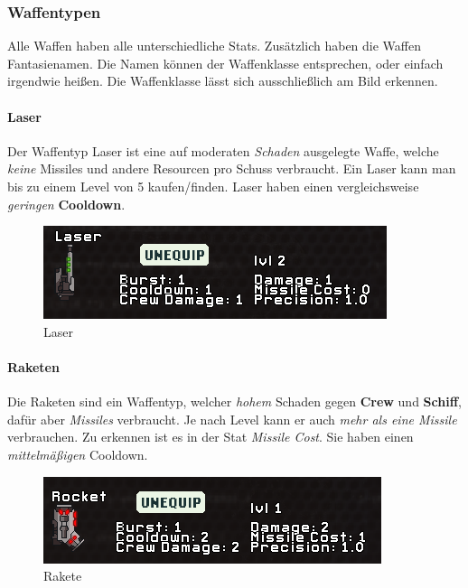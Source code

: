 \documentclass[fontsize=12pt,paper=a4,twoside]{scrartcl}
\begin{document}
\subsubsection{Waffentypen}

Alle Waffen haben alle unterschiedliche Stats. Zusätzlich haben die Waffen Fantasienamen. Die Namen können der Waffenklasse entsprechen, oder einfach irgendwie heißen. Die Waffenklasse lässt sich ausschließlich am Bild erkennen. 

\paragraph{Laser}

Der Waffentyp Laser ist eine auf moderaten \textit{Schaden} ausgelegte Waffe, welche \textit{keine} Missiles und andere Resourcen pro Schuss verbraucht. Ein Laser kann man bis zu einem Level von 5 kaufen/finden. Laser haben einen vergleichsweise \textit{geringen} \textbf{Cooldown}. 


\begin{figure}[H]
\centering
\includegraphics[width=1\linewidth]{DasSpiel/Kampf/waffen/laser.png}
\caption{Laser}
\end{figure}


\paragraph{Raketen}

Die Raketen sind ein Waffentyp, welcher \textit{hohem} Schaden gegen \textbf{Crew} und \textbf{Schiff}, dafür aber \textit{Missiles} verbraucht. Je nach Level kann er auch \textit{mehr als eine Missile} verbrauchen. Zu erkennen ist es in der Stat \textit{Missile Cost}. Sie haben einen \textit{mittelmäßigen} Cooldown.

\begin{figure}[H]
\centering
\includegraphics[width=1\linewidth]{DasSpiel/Kampf/waffen/rakete.png}
\caption{Rakete}
\end{figure}
\end{document}
